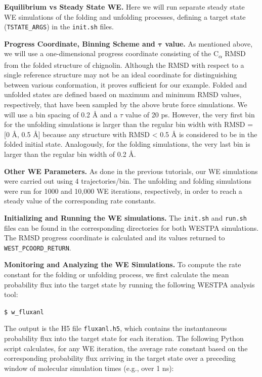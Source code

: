 \documentclass[9pt,tutorial,pubversion]{livecoms}
\begin{document}
\textbf{Equilibrium vs Steady State WE.} Here we will run separate steady state WE simulations of the folding and unfolding processes, defining a target state (\verb|TSTATE_ARGS|) in the \verb|init.sh| files.

\textbf{Progress Coordinate, Binning Scheme and $\pmb{\tau}$ value.} As mentioned above, we will use a one-dimensional progress coordinate consisting of the C\textsubscript{$\alpha$} RMSD from the folded structure of chignolin. 
Although the RMSD with respect to a single reference structure may not be an ideal coordinate for distinguishing between  various conformation, it proves sufficient for our example. 
Folded and unfolded states are defined based on maximum and minimum RMSD values, respectively, that have been sampled by the above brute force simulations. 
We will use a bin spacing  of 0.2 \AA{} and a $\tau$ value of 20 ps. 
However, the very first bin for the unfolding simulations is larger than the regular bin width with RMSD = [0 \AA, 0.5 \AA] because any structure with RMSD < 0.5 \AA{} is considered to be in the folded initial state. 
Analogously, for the folding simulations, the very last bin is larger than the regular bin width of 0.2 \AA. 
  
\textbf{Other WE Parameters.} As done in the previous tutorials, our WE simulations were carried out using 4 trajectories/bin. 
The unfolding and folding simulations were run for 1000 and 10,000 WE iterations, respectively, in order to reach a steady value of the corresponding rate constants. 
 
\textbf{Initializing and Running the WE simulations.} The \verb|init.sh| and \verb|run.sh| files can be found in the corresponding directories for both WESTPA simulations. 
The RMSD progress coordinate is calculated and its values returned to \verb|WEST_PCOORD_RETURN|.   

\textbf{Monitoring and Analyzing the WE Simulations.} To compute the rate constant for the folding or unfolding process, we first calculate the mean probability flux into the target state by running the following WESTPA analysis tool:
 
\verb|$ w_fluxanl|
 
The output is the H5 file \verb|fluxanl.h5|, which contains the instantaneous probability flux into the target state for each iteration. 
The following Python script calculates, for any WE iteration, the average rate constant based on the corresponding probability flux arriving in the target state over a preceding window of molecular simulation times (e.g., over 1 ns):
 
\end{document}
